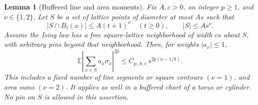 \documentclass[11pt]{article}
\newtheorem{lemma}[theorem]{Lemma}
\theoremstyle{definition}
\theoremstyle{remark}
\numberwithin{equation}{section}
\begin{document}
\begin{lemma}[Buffered line and area moments]\label{fd:moments}
Fix \(A,c>0\), an integer \(p\ge1\), and \(\nu\in\{1,2\}\).
Let \(S\) be a set of lattice points of diameter at most \(As\) such that
\[
 |S\cap B_t(x)|\le A(t+1)^\nu\quad(t\ge0),
 \qquad |S|\le A s^\nu.
\]
Assume the Ising law has a free square-lattice neighborhood of width
\(cs\) about \(S\), with arbitrary pins beyond that neighborhood.
Then, for weights \(|a_x|\le1\),
\begin{equation}
 \mathbb E\left|\sum_{x\in S}a_x\sigma_x\right|^{2p}
 \le C_{p,A,c}\,s^{2p(\nu-1/8)}.
 \label{fd:moment-bound}
\end{equation}
This includes a fixed number of line segments or square contours
\((\nu=1)\), and area sums \((\nu=2)\).  It applies as well in a
buffered chart of a torus or cylinder.  No pin on \(S\) is allowed in
this assertion.
\end{lemma}
\end{document}
